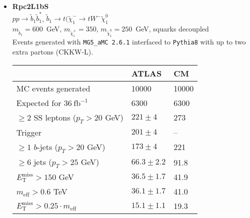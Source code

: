 \documentclass[10pt,fleqn]{article}
\newcommand{\met}{E^\mathrm{miss}_\mathrm{T}}
\newcommand{\meff}{m_\mathrm{eff}}
\begin{document}
\begin{itemize}
\item \textbf{Rpc2L1bS}\\ $ p p \to \tilde{b}_1 \tilde{b}_1^* $, $\tilde{b}_1 \to t (\tilde{\chi}^-_1\to t W^- \tilde{\chi}_1^0$\\
 $m_{\tilde{b}_1} = 600$~GeV, $m_{\tilde{\chi}_1^\pm}  = 350$, $  m_{\tilde{\chi}_1^0} = 250$~GeV, squarks decoupled\\
 Events generated with \texttt{MG5\_aMC 2.6.1} interfaced to \texttt{Pythia8} with up to two extra partons (CKKW-L).
 \begin{tabular}{l|p{3cm}|p{3cm}} \toprule
                                           &  ATLAS           & CM  \\ \midrule
 MC events generated                       &  10000          & 10000 \\ \midrule
 Expected for $36\ \mathrm{fb}^{-1}$       &  6300           & 6300  \\
 $\geq 2$ SS leptons ($p_T > 20$ GeV)      & $221\pm 4$   &   273\\
 Trigger                                   & $201 \pm 4$   &  --\\
 $\geq 1$ $b$-jets ($p_T > 20$ GeV)         & $173 \pm 4$   &  221 \\
 $\geq 6$ jets ($p_T > 25$ GeV)            & $66.3 \pm 2.2$   &  91.8\\
 $\met  > 150$ GeV                         & $36.5 \pm 1.7$   &  41.9\\
 $\meff > 0.6$ TeV                         & $36.1\pm  1.7$   &  41.0\\   
 $\met > 0.25 \cdot \meff$                 & $15.1 \pm 1.1$   &  19.3 \\   \bottomrule 
 \end{tabular}     
 

\end{itemize}
\end{document}
